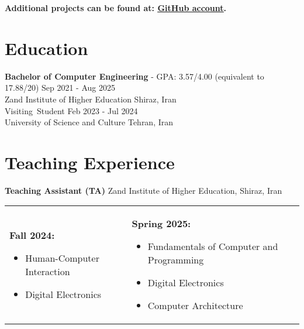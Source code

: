 \documentclass[letter,10pt]{article}
\newcommand{\customsquare}{\raisebox{0.25ex}{\scalebox{0.45}{$\blacksquare$}}}
\begin{document}
\vspace{5pt}

\small \textbf{Additional projects can be found at: \href{https://github.com/karami-mehdi}{\underline{GitHub account}}.}

\section*{Education}
\textbf{Bachelor of Computer Engineering} -  GPA: 3.57/4.00 (equivalent to 17.88/20) \hfill Sep 2021 - Aug 2025 \\
Zand Institute of Higher Education  \hfill Shiraz, Iran \\[5pt]
\mbox{Visiting Student\hspace{0.1mm}} \hfill Feb 2023 - Jul 2024 \\
University of Science and Culture \hfill Tehran, Iran

\section*{Teaching Experience}
\textbf{Teaching Assistant (TA)} \hfill Zand Institute of Higher Education, Shiraz, Iran \\ [5pt]
\begin{tabularx}{\textwidth}{@{}X X@{}}
    \customsquare\hspace{2mm}\textbf{Fall 2024:} 
    \begin{itemize}
        \item Human-Computer Interaction
        \item Digital Electronics
    \end{itemize}
    &
    \customsquare\hspace{2mm}\textbf{Spring 2025:} 
    \begin{itemize}
        \item Fundamentals of Computer and Programming
        \item Digital Electronics
        \item Computer Architecture
    \end{itemize}
\end{tabularx} \\ [-20pt]

\end{document}
